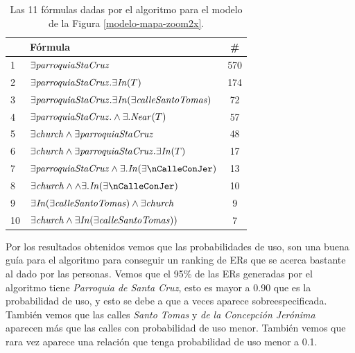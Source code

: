 \begin{table}[H]
\begin{center}
\begin{tabular}{|l|l|c|}
\hline
&F\'ormula			      &  \# \\ \hline \hline
1& $\exists \mathit{parroquiaStaCruz}$& 570\\ \hline

2& $\exists \mathit{parroquiaStaCruz}. \exists \mathit{In}(T)$& 174\\ \hline
3& $\exists \mathit{parroquiaStaCruz}. \exists \mathit{In}(\exists \mathit{calleSantoTomas})$& 72\\ \hline
4& $\exists \mathit{parroquiaStaCruz}. \land \exists.\mathit{Near}(T)$& 57\\ \hline

5& $\exists \mathit{church} \land \exists \mathit{parroquiaStaCruz}$& 48\\ \hline
6& $\exists \mathit{church} \land \exists \mathit{parroquiaStaCruz}. \exists \mathit{In}(T)$& 17\\ \hline
7& $\exists \nParroquiaDeSantaCruz \land \exists. \nIn(\exists \nCalleConJer)$& 13\\ \hline
8& $\exists \nChurch \land \land \exists. \nIn(\exists \nCalleConJer) $&10\\ \hline

9& $\exists \mathit{In}(\exists \mathit{calleSantoTomas}) \land \exists \mathit{church}$&9\\ \hline

10& $\exists \mathit{church} \land \exists \mathit{In}(\exists \mathit{calleSantoTomas}))$&7\\ \hline

\end{tabular}

\caption{Las 11 f\'ormulas dadas por el algoritmo para el modelo de la Figura \protect\ref{modelo-mapa-zoom2x}.}\label{formulas-mapa-zoom2x}
\end{center}
\end{table}

Por los resultados obtenidos vemos que las probabilidades de uso, son una buena gu\'ia para el algoritmo para conseguir un ranking de ERs que se acerca bastante al dado por las personas. Vemos que el 95\% de las ERs generadas por el algoritmo tiene {\it Parroquia de Santa Cruz}, esto es mayor a 0.90 que es la probabilidad de uso, y esto se debe a que a veces aparece sobreespecificada. Tambi\'en vemos que las calles {\it Santo Tomas} y {\it de la Concepci\'on Jer\'onima} aparecen m\'as que las calles con probabilidad de uso menor. Tambi\'en vemos que rara vez aparece una relaci\'on que tenga probabilidad de uso menor a 0.1.     

